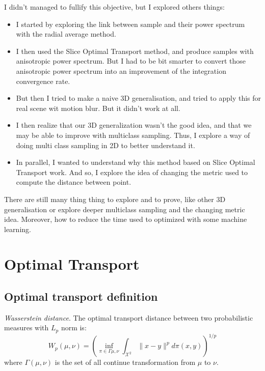 \documentclass{classeENS}
\begin{document}
    \> I didn't managed to fullify this objective, but I explored others things:
    \begin{itemize}
        \item I started by exploring the link between sample and their power spectrum
            with the radial average method.
        \item I then used the Slice Optimal Transport method, and produce samples
            with anisotropic power spectrum. But I had to be bit smarter to convert those
            anisotropic power spectrum into an improvement of the integration convergence 
            rate.
        \item But then I tried to make a naive 3D generalisation, and tried to apply this for
            real scene wit motion blur. But it didn't work at all.
        \item
            I then realize that our 3D generalization wasn't the good idea, and that we may 
            be able to improve with multiclass sampling. Thus, I explore a way of doing
            multi class sampling in 2D to better understand it.
        \item In parallel, I wanted to understand why this method based on Slice Optimal
            Transport work. And so, I explore the idea of changing the metric used to compute
            the distance between point.
    \end{itemize}
    There are still many thing thing to explore and to prove, like other 3D generalisation
    or explore deeper multiclass sampling and the changing metric idea. Moreover, how to
    reduce the time used to optimized with some machine learning.
    

\printbibliography[title={Bibliography}] %

\newpage

\appendix

\section{Optimal Transport}

\subsection{Optimal transport definition}

\> \textit{Wasserstein distance}. The optimal transport distance between two 
    probabilistic measures with $L_p$ norm is:
    \[W_p(\mu, \nu) = \left (\inf_{\pi \in \Gamma{\mu,\nu}} \int_{\mathcal X^2} 
                    \lVert x-y \rVert^p d\pi(x,y) \right )^{1/p}\]
    where $\Gamma(\mu,\nu)$ is the set of all continue transformation from 
    $\mu$ to $\nu$.
\end{document}
